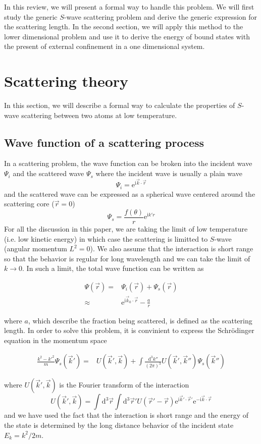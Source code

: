 \documentclass[aps,twocolumn,secnumarabic,balancelastpage,amsmath,amssymb,nofootinbib]{revtex4}
\newcommand{\ud}{\mathrm{d}}
\newcommand{\ue}{\mathrm{e}}
\newcommand{\ui}{\mathrm{i}}
\newcommand{\eqar}[1]
{
  \begin{align*}
    #1
  \end{align*}
}
\newcommand{\paren}[1]{{\left({#1}\right)}}
\begin{document}
In this review, we will present a formal way to handle this problem. We will first study the generic $S$-wave scattering problem and derive the generic expression for the scattering length. In the second section, we will apply this method to the lower dimensional problem and use it to derive the energy of bound states with the present of external confinement in a one dimensional system\cite{feshbach-lecture-note}.

\section{Scattering theory}
In this section, we will describe a formal way to calculate the properties of $S$-wave scattering between two atoms at low temperature.

\subsection{Wave function of a scattering process}
In a scattering problem, the wave function can be broken into the incident wave $\Psi_i$ and the scattered wave $\Psi_s$ where the incident wave is usually a plain wave
\[\Psi_i=\ue^{\ui\vec k\cdot\vec r}\]
and the scattered wave can be expressed as a spherical wave centered around the scattering core ($\vec r=0$)
\[\Psi_s=\frac{f\paren{\theta}}{r}\ue^{\ui k'r}\]
For all the discussion in this paper, we are taking the limit of low temperature (i.e. low kinetic energy) in which case the scattering is limitted to $S$-wave (angular momentum $L^2=0$). We also assume that the interaction is short range so that the behavior is regular for long wavelength and we can take the limit of $k\rightarrow0$. In such a limit, the total wave function can be written as
\eqar{
  \Psi\paren{\vec r}=&\Psi_i\paren{\vec r}+\Psi_s\paren{\vec r}\\
  \approx&\ue^{\ui \vec k_0\cdot \vec r}-\frac{a}{r}
}
where $a$, which describe the fraction being scattered, is defined as the scattering length. In order to solve this problem, it is convinient to express the Schr\"odinger equation in the momentum space
\eqar{
  \frac{k^2-k'^2}{m}\Psi_{s}\paren{\vec k'}=&U\paren{\vec k', \vec k}+\int\frac{\ud^3 k''}{\paren{2\pi}^3}U\paren{\vec k', \vec k''}\Psi_s\paren{\vec k''}
}
where $U\paren{\vec k', \vec k}$ is the Fourier transform of the interaction
\[ U(\vec k', \vec k)=\int\ud^3\vec r\int\ud^3\vec r'U\paren{\vec r'-\vec r}\ue^{\ui\vec k'\cdot\vec r'}\ue^{-\ui\vec k\cdot\vec r}\]
and we have used the fact that the interaction is short range and the energy of the state is determined by the long distance behavior of the incident state $E_k=k^2/2m$.
\end{document}
